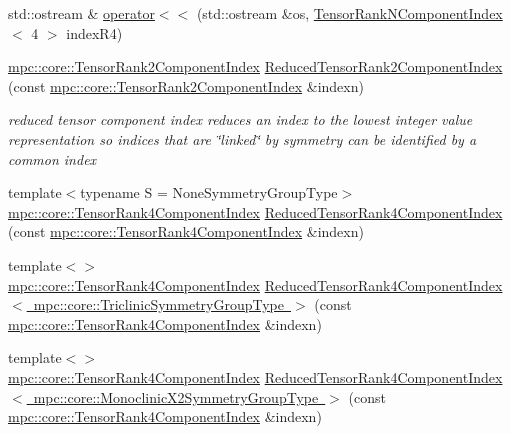 \begin{DoxyCompactItemize}
\item 
std\+::ostream \& \mbox{\hyperlink{namespacempc_1_1core_afbf6f256794f47576046fcc1595ac21a}{operator$<$$<$}} (std\+::ostream \&os, \mbox{\hyperlink{classmpc_1_1core_1_1_tensor_rank_n_component_index}{Tensor\+Rank\+N\+Component\+Index}}$<$ 4 $>$ index\+R4)
\item 
\mbox{\hyperlink{namespacempc_1_1core_a7ae080dac58868c1e167479dce34928a}{mpc\+::core\+::\+Tensor\+Rank2\+Component\+Index}} \mbox{\hyperlink{namespacempc_1_1core_a1c54881498b05ba5ae2813859990a2e3}{Reduced\+Tensor\+Rank2\+Component\+Index}} (const \mbox{\hyperlink{namespacempc_1_1core_a7ae080dac58868c1e167479dce34928a}{mpc\+::core\+::\+Tensor\+Rank2\+Component\+Index}} \&indexn)
\begin{DoxyCompactList}\small\item\em reduced tensor component index reduces an index to the lowest integer value representation so indices that are \char`\"{}linked\char`\"{} by symmetry can be identified by a common index \end{DoxyCompactList}\item 
{\footnotesize template$<$typename S  = None\+Symmetry\+Group\+Type$>$ }\\\mbox{\hyperlink{namespacempc_1_1core_a54c081f41b2475abd10182bf023805d2}{mpc\+::core\+::\+Tensor\+Rank4\+Component\+Index}} \mbox{\hyperlink{namespacempc_1_1core_ae67b259d682419c12fa2e072049d20ad}{Reduced\+Tensor\+Rank4\+Component\+Index}} (const \mbox{\hyperlink{namespacempc_1_1core_a54c081f41b2475abd10182bf023805d2}{mpc\+::core\+::\+Tensor\+Rank4\+Component\+Index}} \&indexn)
\item 
{\footnotesize template$<$$>$ }\\\mbox{\hyperlink{namespacempc_1_1core_a54c081f41b2475abd10182bf023805d2}{mpc\+::core\+::\+Tensor\+Rank4\+Component\+Index}} \mbox{\hyperlink{namespacempc_1_1core_ad70c0223a19e50c5ef2ceda51a00e14b}{Reduced\+Tensor\+Rank4\+Component\+Index$<$ mpc\+::core\+::\+Triclinic\+Symmetry\+Group\+Type $>$}} (const \mbox{\hyperlink{namespacempc_1_1core_a54c081f41b2475abd10182bf023805d2}{mpc\+::core\+::\+Tensor\+Rank4\+Component\+Index}} \&indexn)
\item 
{\footnotesize template$<$$>$ }\\\mbox{\hyperlink{namespacempc_1_1core_a54c081f41b2475abd10182bf023805d2}{mpc\+::core\+::\+Tensor\+Rank4\+Component\+Index}} \mbox{\hyperlink{namespacempc_1_1core_aacad83184cf6ca9921da2fa10cdb3ead}{Reduced\+Tensor\+Rank4\+Component\+Index$<$ mpc\+::core\+::\+Monoclinic\+X2\+Symmetry\+Group\+Type $>$}} (const \mbox{\hyperlink{namespacempc_1_1core_a54c081f41b2475abd10182bf023805d2}{mpc\+::core\+::\+Tensor\+Rank4\+Component\+Index}} \&indexn)

\end{DoxyCompactItemize}
